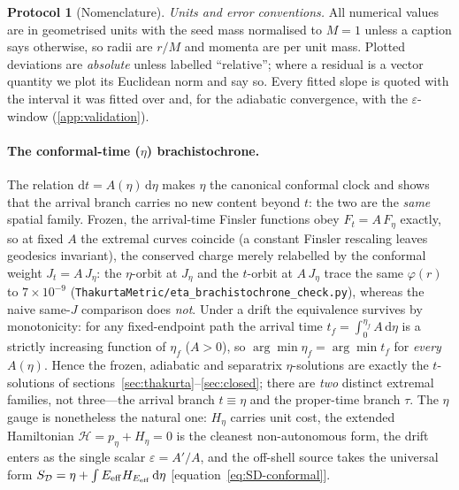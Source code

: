 \documentclass[12pt]{iopart}
\theoremstyle{plain}
\theoremstyle{definition}
\newtheorem{protocol}{Protocol}
\theoremstyle{remark}
\newcommand{\dd}{\mathrm{d}}
\begin{document}
\begin{protocol}[Nomenclature]
\emph{Units and error conventions.} All numerical values are in geometrised
units with the seed mass normalised to $M=1$ unless a caption says otherwise, so
radii are $r/M$ and momenta are per unit mass. Plotted deviations are
\emph{absolute} unless labelled ``relative''; where a residual is a vector
quantity we plot its Euclidean norm and say so. Every fitted slope is quoted
with the interval it was fitted over and, for the adiabatic convergence, with
the $\varepsilon$-window (\ref{app:validation}).
\end{protocol}

\paragraph{The conformal-time ($\eta$) brachistochrone.} The relation
$\dd t=A(\eta)\,\dd\eta$ makes $\eta$ the canonical conformal clock and shows that the
arrival branch carries no new content beyond $t$: the two are the \emph{same} spatial
family. Frozen, the arrival-time Finsler functions obey $F_t=A\,F_\eta$ exactly, so at
fixed $A$ the extremal curves coincide (a constant Finsler rescaling leaves
geodesics invariant), the conserved charge merely relabelled by the conformal weight
$J_t=A\,J_\eta$: the $\eta$-orbit at $J_\eta$ and the $t$-orbit at $A\,J_\eta$ trace the
same $\varphi(r)$ to $7\times10^{-9}$
(\texttt{ThakurtaMetric/eta\_brachistochrone\_check.py}), whereas the naive same-$J$
comparison does \emph{not}. Under a drift the equivalence survives by monotonicity: for
any fixed-endpoint path the arrival time $t_f=\int_0^{\eta_f}A\,\dd\eta$ is a strictly
increasing function of $\eta_f$ ($A>0$), so $\arg\min\eta_f=\arg\min t_f$ for
\emph{every} $A(\eta)$. Hence the frozen, adiabatic and separatrix $\eta$-solutions are
exactly the $t$-solutions of sections~\ref{sec:thakurta}--\ref{sec:closed}; there are
\emph{two} distinct extremal families, not three---the arrival branch $t\equiv\eta$ and
the proper-time branch $\tau$. The $\eta$ gauge is nonetheless the natural one: $H_\eta$
carries unit cost, the extended Hamiltonian $\mathcal H=p_\eta+H_\eta=0$ is the cleanest
non-autonomous form, the drift enters as the single scalar $\varepsilon=A'/A$, and the
off-shell source takes the universal form $S_{\mathcal D}=\eta+\int E_{\rm eff}
H_{E_{\rm eff}}\,\dd\eta$ [equation~\eqref{eq:SD-conformal}].
\end{document}
